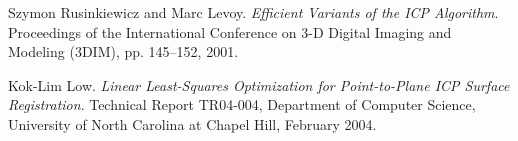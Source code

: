 \documentclass[10pt,twocolumn,letterpaper]{article}
\begin{document}
\begin{thebibliography}{99}
Szymon Rusinkiewicz and Marc Levoy.
\emph{Efficient Variants of the ICP Algorithm}.
Proceedings of the International Conference on 3-D Digital Imaging and
Modeling (3DIM), pp. 145–152, 2001.

Kok-Lim Low.
\emph{Linear Least-Squares Optimization for
Point-to-Plane ICP Surface Registration}.
Technical Report TR04-004, Department of Computer Science, University of North Carolina at Chapel Hill, February 2004.

\end{thebibliography}
\end{document}
